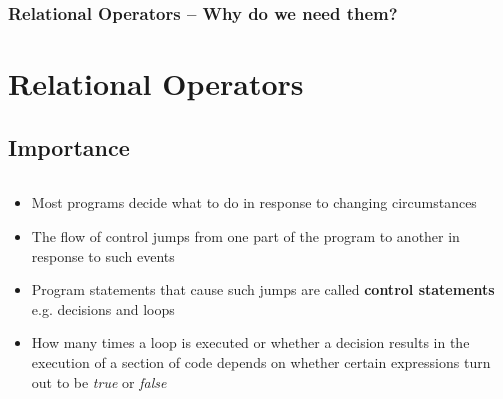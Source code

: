 \documentclass{beamer}
\begin{document}
\begin{frame}
    \frametitle{Relational Operators -- Why do we need them?}
    \section{Relational Operators} %
    \label{sec:relational_operators}
    \subsection{Importance} %
    \label{sub:importance}
    \begin{columns}
        \begin{small}
         \begin{itemize}
            \item Most programs decide what to do in response to changing circumstances
            \item The flow of control jumps from one part of the program to another in response to such events
            \item Program statements that cause such jumps are called \textbf{control statements} e.g. decisions and loops
            \item How many times a loop is executed or whether a decision results in the execution of a section of code depends on whether certain expressions turn out to be \textit{true} or \textit{false}
        \end{itemize}
        \end{small}
       

\end{columns}
\end{frame}
\end{document}
